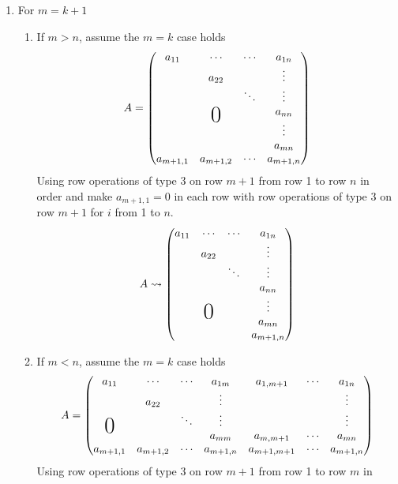\begin{enumerate}
\begin{enumerate}
\end{enumerate}
\item For $m = k + 1$
\begin{enumerate}
\item If $m > n$, assume the $m=k$ case holds
\begin{equation}
A =
\begin{pmatrix}
a_{11} & \cdots & \cdots & a_{1n}\\
& a_{22} & & \vdots\\
& & \ddots & \vdots\\
&\bigzero & & a_{nn}\\
& & & \vdots\\
& & & a_{mn}\\
a_{m+1,1} & a_{m+1,2} & \cdots & a_{m+1,n}
\end{pmatrix}
\end{equation}
Using row operations of type 3 on row $m+1$ from row 1 to row $n$ in
order and make $a_{m+1,1} =0$ in each row with row operations of type
3 on row $m+1$ for $i$ from 1 to $n$.
\begin{equation}
A \leadsto \begin{pmatrix}
a_{11} & \cdots & \cdots & a_{1n}\\
& a_{22} & & \vdots\\
& & \ddots & \vdots\\
& & & a_{nn}\\
&\bigzero & & \vdots\\
& & & a_{mn}\\
& & & a_{m+1,n}
\end{pmatrix}
\end{equation}
\item If $m < n$, assume the $m=k$ case holds
\begin{equation}
A =
\begin{pmatrix}
a_{11} & \cdots & \cdots & a_{1m} & a_{1,m+1} & \cdots & a_{1n}\\
& a_{22} & & \vdots &  & & \vdots\\
\bigzero& & \ddots & \vdots&  & & \vdots\\
& & & a_{mm}& a_{m,m+1} & \cdots & a_{mn}\\
a_{m+1,1} & a_{m+1,2} & \cdots & a_{m+1,n} & a_{m+1,m+1} & \cdots & a_{m+1,n}
\end{pmatrix}
\end{equation}
Using row operations of type 3 on row $m+1$ from row 1 to row $m$ in

\end{enumerate}
\end{enumerate}
